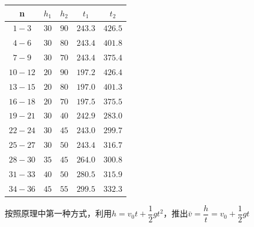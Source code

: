 \documentclass[a4paper]{ltxdoc}
\begin{document}
\begin{multicols}{2}
    \bigskip
    \begin{tabular}{|c|c|c|c|c|}
        \hline \textbf{n} & \textbf{$h_1$} & \textbf{$h_2$} & \textbf{$t_1$} & \textbf{$t_2$} \\
        \hline $1-3$        & $30$                       & $90$           & $243.3$                   & $426.5$        \\
        \hline $4-6$        & $30$                       & $80$           & $243.4$                   & $401.8$        \\
        \hline $7-9$        & $30$                       & $70$           & $243.4$                   & $375.4$        \\
        \hline $10-12$       & $20$                       & $90$           & $197.2$                   & $426.4$        \\
        \hline $13-15$       & $20$                       & $80$           & $197.0$                   & $401.3$        \\
        \hline $16-18$       & $20$                       & $70$           & $197.5$                   & $375.5$        \\
        \hline $19-21$       & $30$                       & $40$           & $242.9$                   & $283.0$        \\
        \hline $22-24$       & $30$                       & $45$           & $243.0$                   & $299.7$        \\
        \hline $25-27$       & $30$                       & $50$           & $243.4$                   & $316.7$        \\
        \hline $28-30$       & $35$                       & $45$           & $264.0$                   & $300.8$        \\
        \hline $31-33$       & $40$                       & $50$           & $280.5$                   & $315.9$        \\
        \hline $34-36$       & $45$                       & $55$           & $299.5$                   & $332.3$        \\
        \hline
    \end{tabular}


    \bigskip
    按照原理中第一种方式，利用$h=v_0 t + \dfrac 12 gt^2$，推出$\bar v=\dfrac h t = v_0 +\dfrac{1}{2} g t$


\end{multicols}
\end{document}
